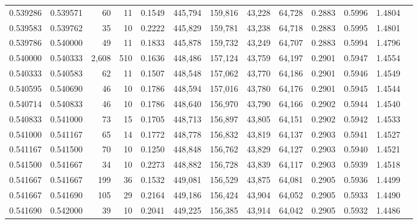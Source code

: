 \begin{tabular}{rrrrrrrrrrrrr}
0.539286 & 0.539571 &    60 &  11 &                                     0.1549 & 445,794 & 159,816 &  43,228 &  64,728 & 0.2883 & 0.5996 & 1.4804 \\
0.539583 & 0.539762 &    35 &  10 &                                     0.2222 & 445,829 & 159,781 &  43,238 &  64,718 & 0.2883 & 0.5995 & 1.4801 \\
0.539786 & 0.540000 &    49 &  11 &                                     0.1833 & 445,878 & 159,732 &  43,249 &  64,707 & 0.2883 & 0.5994 & 1.4796 \\
0.540000 & 0.540333 & 2,608 & 510 &                                     0.1636 & 448,486 & 157,124 &  43,759 &  64,197 & 0.2901 & 0.5947 & 1.4554 \\
0.540333 & 0.540583 &    62 &  11 &                                     0.1507 & 448,548 & 157,062 &  43,770 &  64,186 & 0.2901 & 0.5946 & 1.4549 \\
0.540595 & 0.540690 &    46 &  10 &                                     0.1786 & 448,594 & 157,016 &  43,780 &  64,176 & 0.2901 & 0.5945 & 1.4544 \\
0.540714 & 0.540833 &    46 &  10 &                                     0.1786 & 448,640 & 156,970 &  43,790 &  64,166 & 0.2902 & 0.5944 & 1.4540 \\
0.540833 & 0.541000 &    73 &  15 &                                     0.1705 & 448,713 & 156,897 &  43,805 &  64,151 & 0.2902 & 0.5942 & 1.4533 \\
0.541000 & 0.541167 &    65 &  14 &                                     0.1772 & 448,778 & 156,832 &  43,819 &  64,137 & 0.2903 & 0.5941 & 1.4527 \\
0.541167 & 0.541500 &    70 &  10 &                                     0.1250 & 448,848 & 156,762 &  43,829 &  64,127 & 0.2903 & 0.5940 & 1.4521 \\
0.541500 & 0.541667 &    34 &  10 &                                     0.2273 & 448,882 & 156,728 &  43,839 &  64,117 & 0.2903 & 0.5939 & 1.4518 \\
0.541667 & 0.541667 &   199 &  36 &                                     0.1532 & 449,081 & 156,529 &  43,875 &  64,081 & 0.2905 & 0.5936 & 1.4499 \\
0.541667 & 0.541690 &   105 &  29 &                                     0.2164 & 449,186 & 156,424 &  43,904 &  64,052 & 0.2905 & 0.5933 & 1.4490 \\
0.541690 & 0.542000 &    39 &  10 &                                     0.2041 & 449,225 & 156,385 &  43,914 &  64,042 & 0.2905 & 0.5932 & 1.4486 \\

\end{tabular}
